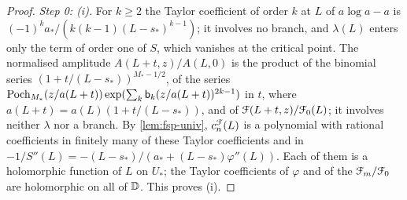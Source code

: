 \begin{proof}
\emph{Step 0: (i).} For $k\geq 2$ the Taylor coefficient of order $k$ at $L$ of $a\log a-a$ is $(-1)^ka_*/(k(k-1)(L-s_*)^{k-1})$; it involves no branch, and $\lambda(L)$ enters only the term of order one of $S$, which vanishes at the critical point. The normalised amplitude $A(L+t,z)/A(L,0)$ is the product of the binomial series $(1+t/(L-s_*))^{M_*-1/2}$, of the series $\mathrm{Poch}_{M_*}(z/a(L+t))\exp(\sum_k\mathsf{b}_k(z/a(L+t))^{2k-1})$ in $t$, where $a(L+t)=a(L)(1+t/(L-s_*))$, and of $\mathcal{F}(L+t,z)/\mathcal{F}_0(L)$; it involves neither $\lambda$ nor a branch. By \cref{lem:fsp-univ}, $c^{\mathcal{F}}_n(L)$ is a polynomial with rational coefficients in finitely many of these Taylor coefficients and in $-1/S''(L)=-(L-s_*)/(a_*+(L-s_*)\varphi''(L))$. Each of them is a holomorphic function of $L$ on $U_*$; the Taylor coefficients of $\varphi$ and of the $\mathcal{F}_m/\mathcal{F}_0$ are holomorphic on all of $\mathbb{D}$. This proves (i).


\end{proof}
